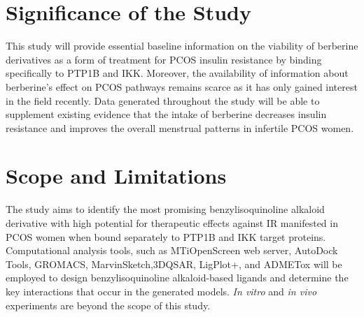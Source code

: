 \section{Significance of the Study}
This study will provide essential baseline information on the viability of berberine derivatives as a form of treatment for PCOS insulin resistance by binding specifically to PTP1B and IKK. Moreover, the availability of information about berberine’s effect on PCOS pathways remains scarce as it has only gained interest in the field recently. Data generated throughout the study will be able to supplement existing evidence that the intake of berberine decreases insulin resistance and improves the overall menstrual patterns in infertile PCOS women. 

\section{Scope and Limitations}
The study aims to identify the most promising benzylisoquinoline alkaloid derivative with high potential for therapeutic effects against IR manifested in PCOS women when bound separately to PTP1B and IKK target proteins. Computational analysis tools, such as MTiOpenScreen web server, AutoDock Tools, GROMACS, MarvinSketch,3DQSAR, LigPlot+, and ADMETox will be employed to design benzylisoquinoline alkaloid-based ligands and determine the key interactions that occur in the generated models. \textit{In vitro} and \textit{in vivo} experiments are beyond the scope of this study.